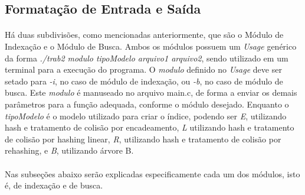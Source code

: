 \documentclass[12pt,a4paper]{article}
\begin{document}
  \subsection{Formatação de Entrada e Saída}
   {\paragraph{} Há duas subdivisões, como mencionadas anteriormente, que são o Módulo de Indexação e o Módulo de Busca. Ambos os módulos possuem um \emph{Usage} genérico da forma \emph{./trab2 modulo tipoModelo arquivo1 arquivo2}, sendo utilizado em um terminal para a execução do programa. O \emph{modulo} definido no \emph{Usage} deve ser setado para \emph{-i}, no caso de módulo de indexação, ou \emph{-b}, no caso de módulo de busca. Este \emph{modulo} é manuseado no arquivo main.c, de forma a enviar os demais parâmetros para a função adequada, conforme o módulo desejado. Enquanto o \emph{tipoModelo} é o modelo utilizado para criar o índice, podendo ser \emph{E}, utilizando hash e tratamento de colisão por encadeamento, \emph{L} utilizando hash e tratamento de colisão por hashing linear, \emph{R}, utilizando hash e tratamento de colisão por rehashing, e \emph{B}, utilizando árvore B.}
   {\paragraph{} Nas subseções abaixo serão explicadas especificamente cada um dos módulos, isto é, de indexação e de busca.}
   
\end{document}

